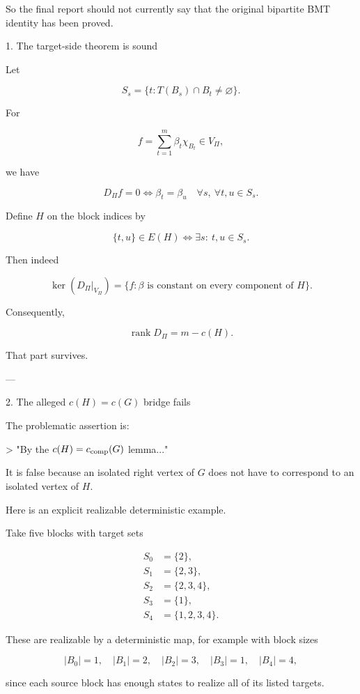So the final report should not currently say that the original bipartite BMT identity has been proved.

1. The target-side theorem is sound

Let

\[
S_s=\{t:T(B_s)\cap B_t\neq\varnothing\}.
\]

For

\[
f=\sum_{t=1}^m\beta_t\chi_{B_t}\in V_\Pi,
\]

we have

\[
D_\Pi f=0
\iff
\beta_t=\beta_u
\quad
\forall s,\ \forall t,u\in S_s.
\]

Define \(H\) on the block indices by

\[
\{t,u\}\in E(H)
\iff
\exists s:\ t,u\in S_s.
\]

Then indeed

\[
\ker(D_\Pi|_{V_\Pi})
=
\{f:\beta\text{ is constant on every component of }H\}.
\]

Consequently,

\[
\boxed{\operatorname{rank}D_\Pi=m-c(H)}.
\]

That part survives.


---

2. The alleged \(c(H)=c(G)\) bridge fails

The problematic assertion is:

> "By the \(c(H)=c_{\rm comp}(G)\) lemma..."



It is false because an isolated right vertex of \(G\) does not have to correspond to an isolated vertex of \(H\).

Here is an explicit realizable deterministic example.

Take five blocks with target sets

\[
\begin{aligned}
S_0&=\{2\},\\
S_1&=\{2,3\},\\
S_2&=\{2,3,4\},\\
S_3&=\{1\},\\
S_4&=\{1,2,3,4\}.
\end{aligned}
\]

These are realizable by a deterministic map, for example with block sizes

\[
|B_0|=1,\quad |B_1|=2,\quad |B_2|=3,\quad
|B_3|=1,\quad |B_4|=4,
\]

since each source block has enough states to realize all of its listed targets.

